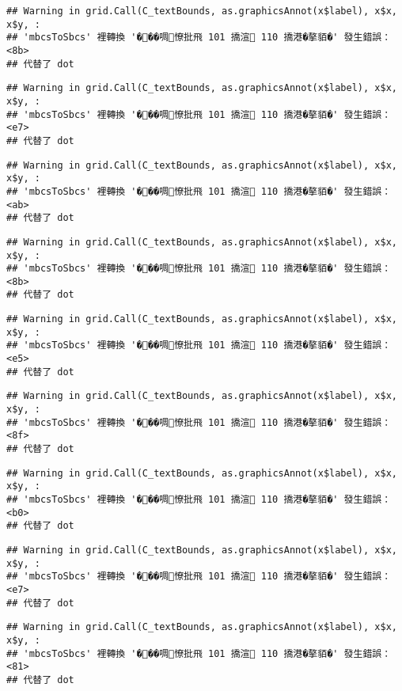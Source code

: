 \documentclass[
]{article}
\begin{document}
\begin{verbatim}
## Warning in grid.Call(C_textBounds, as.graphicsAnnot(x$label), x$x, x$y, :
## 'mbcsToSbcs' 裡轉換 '���啁憭批飛 101 撟渲 110 撟港�摮貊�' 發生錯誤：<8b>
## 代替了 dot
\end{verbatim}

\begin{verbatim}
## Warning in grid.Call(C_textBounds, as.graphicsAnnot(x$label), x$x, x$y, :
## 'mbcsToSbcs' 裡轉換 '���啁憭批飛 101 撟渲 110 撟港�摮貊�' 發生錯誤：<e7>
## 代替了 dot
\end{verbatim}

\begin{verbatim}
## Warning in grid.Call(C_textBounds, as.graphicsAnnot(x$label), x$x, x$y, :
## 'mbcsToSbcs' 裡轉換 '���啁憭批飛 101 撟渲 110 撟港�摮貊�' 發生錯誤：<ab>
## 代替了 dot
\end{verbatim}

\begin{verbatim}
## Warning in grid.Call(C_textBounds, as.graphicsAnnot(x$label), x$x, x$y, :
## 'mbcsToSbcs' 裡轉換 '���啁憭批飛 101 撟渲 110 撟港�摮貊�' 發生錯誤：<8b>
## 代替了 dot
\end{verbatim}

\begin{verbatim}
## Warning in grid.Call(C_textBounds, as.graphicsAnnot(x$label), x$x, x$y, :
## 'mbcsToSbcs' 裡轉換 '���啁憭批飛 101 撟渲 110 撟港�摮貊�' 發生錯誤：<e5>
## 代替了 dot
\end{verbatim}

\begin{verbatim}
## Warning in grid.Call(C_textBounds, as.graphicsAnnot(x$label), x$x, x$y, :
## 'mbcsToSbcs' 裡轉換 '���啁憭批飛 101 撟渲 110 撟港�摮貊�' 發生錯誤：<8f>
## 代替了 dot
\end{verbatim}

\begin{verbatim}
## Warning in grid.Call(C_textBounds, as.graphicsAnnot(x$label), x$x, x$y, :
## 'mbcsToSbcs' 裡轉換 '���啁憭批飛 101 撟渲 110 撟港�摮貊�' 發生錯誤：<b0>
## 代替了 dot
\end{verbatim}

\begin{verbatim}
## Warning in grid.Call(C_textBounds, as.graphicsAnnot(x$label), x$x, x$y, :
## 'mbcsToSbcs' 裡轉換 '���啁憭批飛 101 撟渲 110 撟港�摮貊�' 發生錯誤：<e7>
## 代替了 dot
\end{verbatim}

\begin{verbatim}
## Warning in grid.Call(C_textBounds, as.graphicsAnnot(x$label), x$x, x$y, :
## 'mbcsToSbcs' 裡轉換 '���啁憭批飛 101 撟渲 110 撟港�摮貊�' 發生錯誤：<81>
## 代替了 dot
\end{verbatim}
\end{document}
